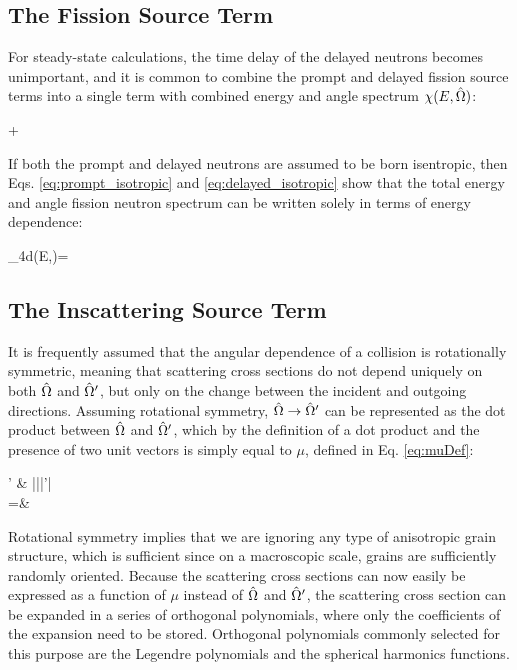\subsection{The Fission Source Term}

For steady-state calculations, the time delay of the delayed neutrons becomes unimportant, and it is common to combine the prompt and delayed fission source terms into a single term with combined energy and angle spectrum \(\chi(E,\hat{\Omega})\):

\beqa
\promptfissionsource\psi\seatprime+\delayedfissionsource\rightarrow\\
\totalfissionsource\psi\seatprime
\eeqa

If both the prompt and delayed neutrons are assumed to be born isentropic, then Eqs. \eqref{eq:prompt_isotropic} and \eqref{eq:delayed_isotropic} show that the total energy and angle fission neutron spectrum can be written solely in terms of energy dependence:

\beq
\int_{4\pi}d\hO\chi(E,\hO)=
\eeq

\subsection{The Inscattering Source Term}

It is frequently assumed that the angular dependence of a collision is rotationally symmetric, meaning that scattering cross sections do not depend uniquely on both \(\hat{\Omega}\) and \(\hat{\Omega}'\), but only on the change between the incident and outgoing directions. Assuming rotational symmetry, \(\hat{\Omega}\rightarrow\hat{\Omega}'\) can be represented as the dot product between \(\hat{\Omega}\) and \(\hat{\Omega}'\), which by the definition of a dot product and the presence of two unit vectors is simply equal to \(\mu\), defined in Eq. \eqref{eq:muDef}:

\beqa
\label{eq:OmegaDotOmega}
\hO  \cdot\hO  ' \equiv& |\hO  ||\hO  '| \cos{(\theta)} \\
=&\ \mu
\eeqa

Rotational symmetry implies that we are ignoring any type of anisotropic grain structure, which is sufficient since on a macroscopic scale, grains are sufficiently randomly oriented. Because the scattering cross sections can now easily be expressed as a function of \(\mu\) instead of \(\hat{\Omega}\) and \(\hat{\Omega}'\), the scattering cross section can be expanded in a series of orthogonal polynomials, where only the coefficients of the expansion need to be stored. Orthogonal polynomials commonly selected for this purpose are the Legendre polynomials and the spherical harmonics functions.

